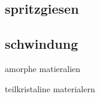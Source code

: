\subsection{spritzgiesen}

\subsection{schwindung}

amorphe matieralien

teilkristaline materialern
